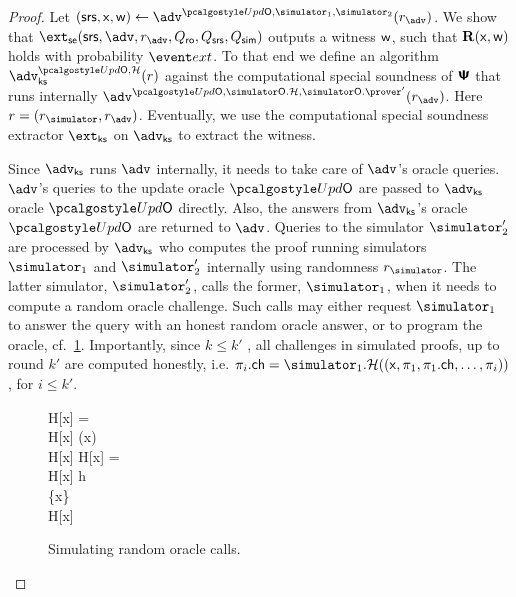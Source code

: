 \begin{proof}	
	Let $(\srs, \inp, \wit) \gets \advse^{\initU, \simulator_1, \simulator_2}(r_{\advse})$. We show that $\extse (\srs, \advse, r_{\advse}, \Qro, \Qsrs, \Qsim)$ outputs a witness $\mathsf{w}$, such that $\mathbf{R}(\mathsf{x}, \mathsf{w})$ holds with probability $\extProb$. To that end we define an algorithm $\advcss^{\initU,\ro}(r)$ against the computational special soundness of $\bm{\mathsf{\Psi}}$ that runs internally $\advse^{\initU, \simulator\oracleo.\ro, \simulator\oracleo.\prover'}(r_{\advse})$. Here $r = (\rsim, r_{\advse})$. Eventually, we use the computational special soundness extractor $\extcss$ on $\advcss$ to extract the witness.
	
	Since $\advcss$ runs $\advse$ internally, it needs to take care of $\advse$'s oracle queries.
	$\advse$'s queries to the update oracle $\initU$ are passed to $\advcss$ oracle $\initU$ directly. Also, the answers from $\advcss$'s oracle $\initU$ are returned to $\advse$.
	Queries to the simulator $\simulator'_2$ are processed by $\advcss$ who computes the proof running simulators $\simulator_1$ and $\simulator'_2$ internally using randomness $\rsim$. The latter simulator, $\simulator'_{2}$, calls the former, $\simulator_{1}$, when it needs to compute a random oracle challenge. Such calls may either request $\simulator_{1}$ to answer the query with an honest random oracle answer, or to program the oracle, cf.~\cref{fig:simulator_oracles}. Importantly, since $k \leq k'$ , all challenges in simulated proofs, up to round $k'$ are computed honestly, i.e. $\zkproof_{i}.\ch = \simulator_{1}.\ro((\inp, \zkproof_1, \zkproof_1.\ch, \ldots, \zkproof_{i}))$, for $i \leq k'$.
	\begin{figure}
		\centering
			\begin{pcvstack}
			\begin{pchstack}
				{
				\pcif H[x] = \bot \pcthen \\
				\pcind H[x] \gets \ro(x) \\
				\pcreturn H[x]
		  		}
				\pchspace
				{ 
					\pcif H[x] = \bot \pcthen \\ 
					\pcind H[x] \gets h \\
					\pcind \Qprog \gets \Qprog \cup \{x\}\\
					\pcreturn H[x]
				}
			\end{pchstack}
		\end{pcvstack}
		\caption{Simulating random oracle calls.}
		\label{fig:simulator_oracles}
	\end{figure}	


\end{proof}
